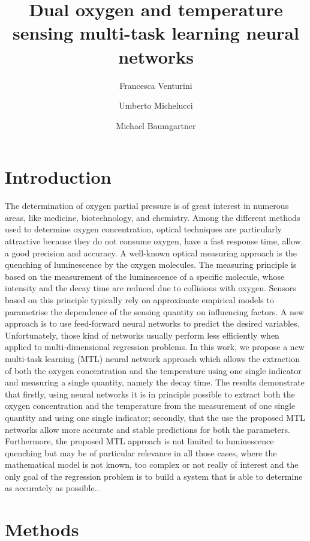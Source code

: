 \documentclass[9pt,twocolumn,twoside,pdftex]{optica}
\title{Dual oxygen and temperature sensing multi-task learning neural networks}
\author[1,2,*]{Francesca Venturini}
\author[2]{Umberto Michelucci}
\author[1]{Michael Baumgartner}
\affil[1]{Institute of Applied Mathematics and Physics, Zurich University of Applied Sciences,
Technikumstrasse 9, 8401 Winterthur, Switzerland}
\affil[2]{TOELT LLC; Birchlenstr. 25, 8600 Dübendorf, Switzerland}
\affil[*]{Corresponding author: francesca.venturini@zhaw.ch}
\begin{document}
\maketitle

\section{Introduction}

The determination of oxygen partial pressure is of great interest in numerous areas, like medicine, biotechnology, and chemistry. Among the different methods used to determine oxygen concentration, optical techniques are particularly attractive because they do not consume oxygen, have a fast response time, allow a good precision and accuracy. A well-known optical measuring approach is the quenching of luminescence by the oxygen molecules. The measuring principle is based on the measurement of the luminescence of a specific molecule, whose intensity and the decay time are reduced due to collisions with oxygen. Sensors based on this principle typically rely on approximate empirical models to parametrise the dependence of the sensing quantity on influencing factors. A new approach is to use feed-forward neural networks to predict the desired variables. Unfortunately, those kind of networks usually perform less efficiently when applied to multi-dimensional regression problems. In this work, we propose a new multi-task learning (MTL) neural network approach which allows the extraction of both the oxygen concentration and the temperature using one single indicator and measuring a single quantity, namely the decay time. The results demonstrate that firstly, using neural networks it is in principle possible to extract both the oxygen concentration and the temperature from the measurement of one single quantity and using one single indicator; secondly, that the use the proposed MTL networks allow more accurate and stable predictions for both the parameters. Furthermore, the proposed MTL approach is not limited to luminescence quenching but may be of particular relevance in all those cases, where the mathematical model is not known, too complex or not really of interest and the only goal of the regression problem is to build a system that is able to determine as accurately as possible..

\section{Methods}
\label{sec:methods}
\end{document}
